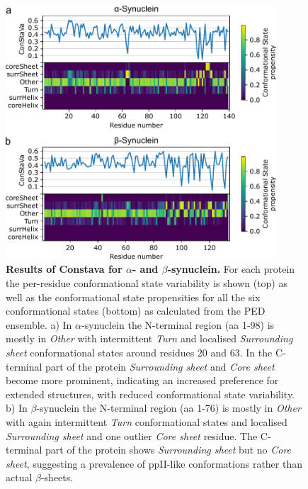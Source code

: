 \begin{figure}[!t]
    \centering
    \includegraphics[width=0.9\textwidth]{constava/figures_constava/figure7.pdf}
    \caption{
        \textbf{Results of Constava for $\alpha$- and $\beta$-synuclein.} 
        For each protein the per-residue conformational state variability is shown (top) as well as the conformational state propensities for all the six conformational states (bottom) as calculated from the PED ensemble.
        a) In $\alpha$-synuclein the N-terminal region (aa 1-98) is mostly in \textit{Other} with intermittent \textit{Turn} and localised \textit{Surrounding sheet} conformational states around residues 20 and 63. In the C-terminal part of the protein \textit{Surrounding sheet} and \textit{Core sheet} become more prominent, indicating an increased preference for extended structures, with reduced conformational state variability.
        b) In $\beta$-synuclein the N-terminal region (aa 1-76) is mostly in \textit{Other} with again intermittent \textit{Turn} conformational states and localised \textit{Surrounding sheet} and one outlier \textit{Core sheet} residue. The C-terminal part of the protein shows \textit{Surrounding sheet} but no \textit{Core sheet}, suggesting a prevalence of ppII-like conformations rather than actual $\beta$-sheets.} \label{fig:synucleins}
\end{figure}

